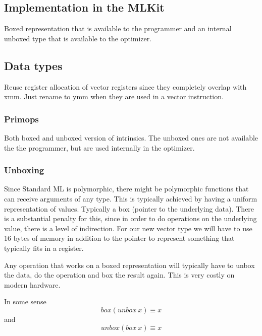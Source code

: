 \documentclass{article}
\begin{document}
\subsection{Implementation in the MLKit}

Boxed representation that is available to the programmer and an internal unboxed type that is available to the optimizer.

\subsection{Data types}

Reuse register allocation of vector registers since they completely overlap with xmm. Just rename to ymm when they are used in a vector instruction.

\subsubsection{Primops}

Both boxed and unboxed version of intrinsics. The unboxed ones are not available the the programmer, but are used internally in the optimizer.

\subsubsection{Unboxing}

Since Standard ML is polymorphic, there might be polymorphic functions that can receive arguments of any type. This is typically achieved by having a uniform representation of values. Typically a box (pointer to the underlying data). There is a substantial penalty for this, since in order to do operations on the underlying value, there is a level of indirection. For our new vector type we will have to use 16 bytes of memory in addition to the pointer to represent something that typically fits in a register.

Any operation that works on a boxed representation will typically have to unbox the data, do the operation and box the result again. This is very costly on modern hardware.

In some sense
\[
    box (unbox\ x) \equiv x
\]
and
\[
    unbox (box\ x) \equiv x
\]



\end{document}
